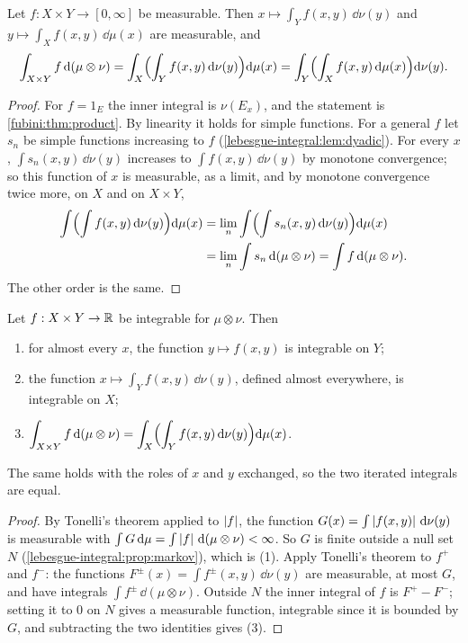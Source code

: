 \begin{notechapter}
\begin{theorem}[Tonelli]\label{fubini:thm:tonelli}
Let $f:X\times Y\to[0, \infty]$ be measurable. Then
$x\mapsto\int_Yf(x, y)\,\dd\nu(y)$ and
$y\mapsto\int_Xf(x, y)\,\dd\mu(x)$ are measurable, and
\[
  \int_{X\times Y}f\,\mathrm{d}(\mu\otimes\nu)
  = \int_X\Bigl(\int_Yf(x, y)\,\mathrm{d}\nu(y)\Bigr)\mathrm{d}\mu(x)
  = \int_Y\Bigl(\int_Xf(x, y)\,\mathrm{d}\mu(x)\Bigr)\mathrm{d}\nu(y) .
\]
\end{theorem}

\begin{proof}
For $f = 1_E$ the inner integral is $\nu(E_x)$, and the statement is
\cref{fubini:thm:product}. By linearity it holds for simple functions.
For a general $f$ let $s_n$ be simple functions increasing to $f$
(\cref{lebesgue-integral:lem:dyadic}). For every $x$,
$\int s_n(x, y)\,\dd\nu(y)$ increases to $\int f(x, y)\,\dd\nu(y)$ by
monotone convergence; so this function of $x$ is measurable, as a
limit, and by monotone convergence twice more, on $X$ and on
$X\times Y$,
\begin{align*}
  \int\Bigl(\int f(x, y)\,\mathrm{d}\nu(y)\Bigr)\mathrm{d}\mu(x)
  &= \lim_n\int\Bigl(\int s_n(x, y)\,\mathrm{d}\nu(y)\Bigr)\mathrm{d}\mu(x) \\
  &= \lim_n\int s_n\,\mathrm{d}(\mu\otimes\nu) = \int f\,\mathrm{d}(\mu\otimes\nu) .
\end{align*}
The other order is the same.
\end{proof}

\begin{theorem}[Fubini]\label{fubini:thm:fubini}
Let $f:X\times Y\to\mathbb{R}$ be integrable for $\mu\otimes\nu$. Then
\begin{enumerate}[nosep]
  \item for almost every $x$, the function $y\mapsto f(x, y)$ is
        integrable on $Y$;
  \item the function $x\mapsto\int_Yf(x, y)\,\dd\nu(y)$, defined almost
        everywhere, is integrable on $X$;
  \item $\displaystyle\int_{X\times Y}f\,\mathrm{d}(\mu\otimes\nu)
        = \int_X\Bigl(\int_Yf(x, y)\,\mathrm{d}\nu(y)\Bigr)\mathrm{d}\mu(x)$.
\end{enumerate}
The same holds with the roles of $x$ and $y$ exchanged, so the two
iterated integrals are equal.
\end{theorem}

\begin{proof}
By Tonelli's theorem applied to $\left|f\right|$, the function
$G(x) = \int\left|f(x, y)\right|\,\mathrm{d}\nu(y)$ is measurable with
$\int G\,\mathrm{d}\mu = \int\left|f\right|\,\mathrm{d}(\mu\otimes\nu) < \infty$. So $G$ is
finite outside a null set $N$ (\cref{lebesgue-integral:prop:markov}),
which is (1). Apply Tonelli's theorem to $f^+$ and $f^-$: the functions
$F^\pm(x) = \int f^\pm(x, y)\,\dd\nu(y)$ are measurable, at most $G$,
and have integrals $\int f^\pm\,\dd(\mu\otimes\nu)$. Outside $N$ the
inner integral of $f$ is $F^+ - F^-$; setting it to $0$ on $N$ gives a
measurable function, integrable since it is bounded by $G$, and
subtracting the two identities gives (3).
\end{proof}


\end{notechapter}
